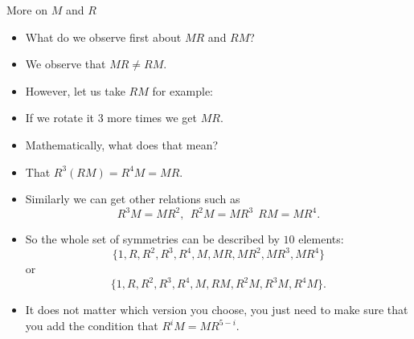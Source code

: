 \documentclass[ %
 10pt, xcolor={dvipsnames,svgnames,x11names,hyperref},
   hyperref={colorlinks=true,citecolor=green,linkcolor=DarkRed,urlcolor=ProcessBlue,anchorcolor=blue}
  ]{beamer}
\newenvironment{stepitemize}{\begin{itemize}[<+->]}{\end{itemize} }
\begin{document}
\begin{frame}{More on $M$ and $R$}
\begin{stepitemize}
    \item What do we observe first about $MR$ and $RM$?
    \item We observe that $MR\neq RM$.
    \item However, let us take $RM$ for example:
    \item If we rotate it $3$ more times we get $MR$.
    \item Mathematically, what does that mean?
    \item That $R^3(RM) = R^4M=MR$.
    \item Similarly we can get other relations such as 
    $$R^3M=MR^2, \:\: R^2M=MR^3\:\: RM = MR^4.$$
    \item So the whole set of symmetries can be described by $10$ elements:
    $$\{1, R, R^2, R^3, R^4, M, MR, MR^2, MR^3, MR^4\}$$ or
    $$\{1, R, R^2, R^3, R^4, M, RM, R^2M, R^3M, R^4M\}.$$
    \item It does not matter which version you choose, you just need to make sure that you add the condition that $R^iM = MR^{5-i}$.
\end{stepitemize}
    
\end{frame}
\end{document}
